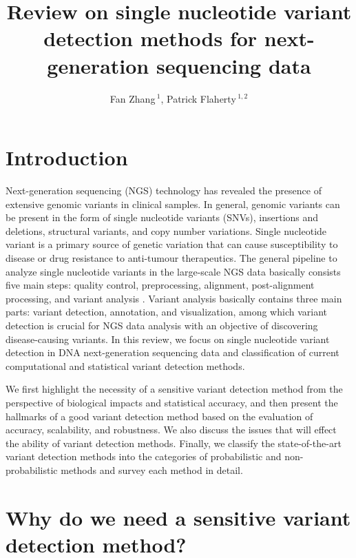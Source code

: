\documentclass[11pt,reqno]{amsart}
\title[Reveiw on RVD Methods]{Review on single nucleotide variant detection methods for next-generation sequencing data}
\author[F. Zhang AND P. Flaherty]{Fan Zhang\,$^{1}$, Patrick Flaherty\,$^{1,2}$}
\begin{document}
\maketitle

\section{Introduction}
Next-generation sequencing (NGS) technology has revealed the presence of extensive genomic variants in clinical samples.
In general, genomic variants can be present in the form of single nucleotide variants (SNVs), insertions and deletions, structural variants, and copy number variations.
Single nucleotide variant is a primary source of genetic variation that can cause susceptibility to disease or drug resistance to  anti-tumour therapeutics.
The general pipeline to analyze single nucleotide variants in the large-scale NGS data basically consists five main steps: quality control, preprocessing, alignment, post-alignment processing, and variant analysis \citep{Bao2014}.
Variant analysis basically contains three main parts: variant detection, annotation, and visualization, among which variant detection is crucial for NGS data analysis with an objective of discovering disease-causing variants.
In this review, we focus on single nucleotide variant detection in DNA next-generation sequencing data and classification of current computational and statistical variant detection methods.

We first highlight the necessity of a sensitive variant detection method from the perspective of biological impacts and statistical accuracy,
and then present the hallmarks of a good variant detection method based on the evaluation of accuracy, scalability, and robustness.
We also discuss the issues that will effect the ability of variant detection methods.
Finally, we classify the state-of-the-art variant detection methods into the categories of probabilistic and non-probabilistic methods and survey each method in detail.


\section{Why do we need a sensitive variant detection method?}
\end{document}
